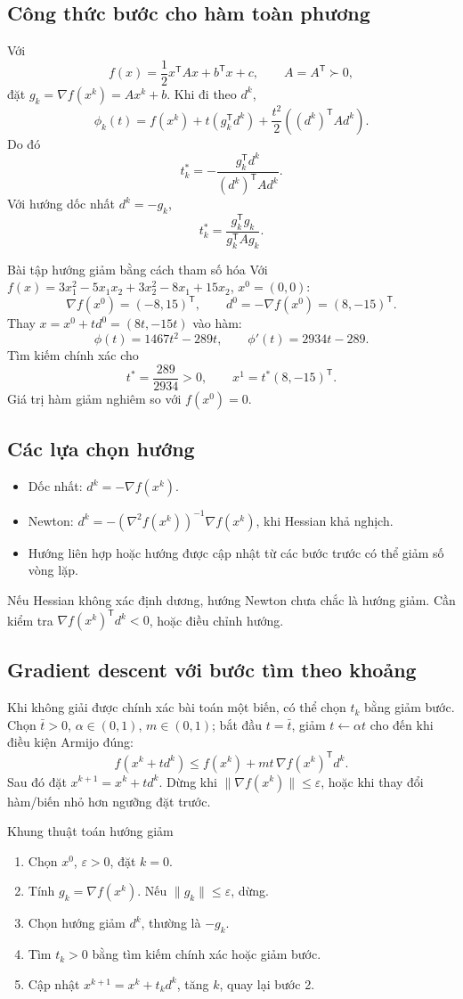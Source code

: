 \documentclass[11pt,a4paper]{article}
\newcommand{\grad}{\nabla}
\newcommand{\Hess}{\nabla^2}
\newcommand{\T}{^{\mathsf T}}
\begin{document}
\subsection{Công thức bước cho hàm toàn phương}
Với
\[
f(x)=\frac12x\T A x+b\T x+c,\qquad A=A\T\succ0,
\]
đặt \(g_k=\grad f(x^k)=Ax^k+b\). Khi đi theo \(d^k\),
\[
\phi_k(t)=f(x^k)+t(g_k\T d^k)+\frac{t^2}{2}((d^k)\T A d^k).
\]
Do đó
\[
t_k^*=-\frac{g_k\T d^k}{(d^k)\T A d^k}.
\]
Với hướng dốc nhất \(d^k=-g_k\),
\[
t_k^*=\frac{g_k\T g_k}{g_k\T A g_k}.
\]

\begin{exbox}{Bài tập hướng giảm bằng cách tham số hóa}
Với \(f(x)=3x_1^2-5x_1x_2+3x_2^2-8x_1+15x_2\), \(x^0=(0,0)\):
\[
\grad f(x^0)=(-8,15)\T,\qquad d^0=-\grad f(x^0)=(8,-15)\T.
\]
Thay \(x=x^0+td^0=(8t,-15t)\) vào hàm:
\[
\phi(t)=1467t^2-289t,\qquad
\phi'(t)=2934t-289.
\]
Tìm kiếm chính xác cho
\[
t^*=\frac{289}{2934}>0,\qquad x^1=t^*(8,-15)\T.
\]
Giá trị hàm giảm nghiêm so với \(f(x^0)=0\).
\end{exbox}

\subsection{Các lựa chọn hướng}
\begin{itemize}
\item Dốc nhất: \(d^k=-\grad f(x^k)\).
\item Newton: \(d^k=-(\Hess f(x^k))^{-1}\grad f(x^k)\), khi Hessian khả nghịch.
\item Hướng liên hợp hoặc hướng được cập nhật từ các bước trước có thể giảm số vòng lặp.
\end{itemize}
Nếu Hessian không xác định dương, hướng Newton chưa chắc là hướng giảm. Cần kiểm tra \(\grad f(x^k)\T d^k<0\), hoặc điều chỉnh hướng.

\subsection{Gradient descent với bước tìm theo khoảng}
Khi không giải được chính xác bài toán một biến, có thể chọn \(t_k\) bằng giảm bước. Chọn \(\bar t>0\), \(\alpha\in(0,1)\), \(m\in(0,1)\); bắt đầu \(t=\bar t\), giảm \(t\leftarrow\alpha t\) cho đến khi điều kiện Armijo đúng:
\[
f(x^k+t d^k)\le f(x^k)+m t\,\grad f(x^k)\T d^k.
\]
Sau đó đặt \(x^{k+1}=x^k+t d^k\). Dừng khi \(\|\grad f(x^k)\|\le\varepsilon\), hoặc khi thay đổi hàm/biến nhỏ hơn ngưỡng đặt trước.

\begin{keybox}{Khung thuật toán hướng giảm}
\begin{enumerate}
\item Chọn \(x^0\), \(\varepsilon>0\), đặt \(k=0\).
\item Tính \(g_k=\grad f(x^k)\). Nếu \(\|g_k\|\le\varepsilon\), dừng.
\item Chọn hướng giảm \(d^k\), thường là \(-g_k\).
\item Tìm \(t_k>0\) bằng tìm kiếm chính xác hoặc giảm bước.
\item Cập nhật \(x^{k+1}=x^k+t_kd^k\), tăng \(k\), quay lại bước 2.
\end{enumerate}
\end{keybox}
\end{document}
